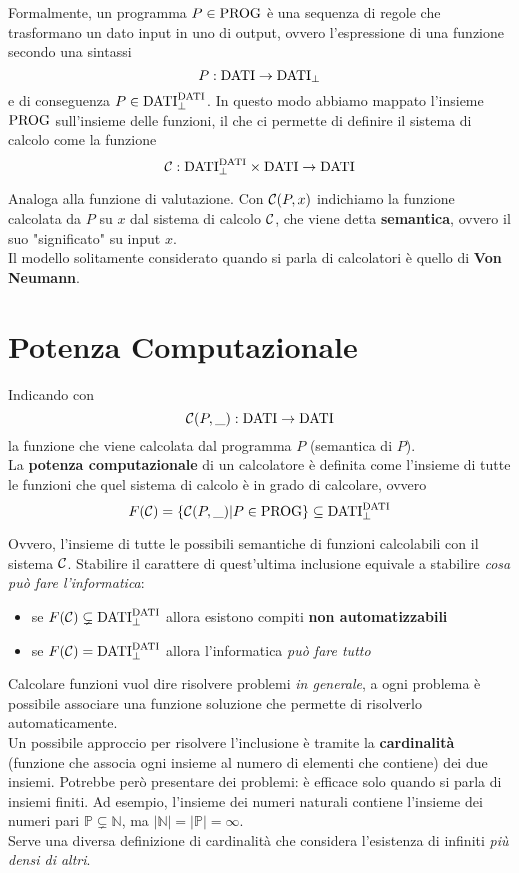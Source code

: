 Formalmente, un programma $P \in \text{PROG}$ è una sequenza di regole che trasformano un dato input in uno di output, ovvero l'espressione di una funzione secondo una sintassi 
$$ P: \text{DATI} \rightarrow \text{DATI}_\bot $$
e di conseguenza $P \in \text{DATI}^{\text{DATI}}_\bot$. In questo modo abbiamo mappato l'insieme $\text{PROG}$ sull'insieme delle funzioni, il che ci permette di definire il sistema di calcolo come la funzione
$$ \mathcal{C}: \text{DATI}^{\text{DATI}}_\bot \times \text{DATI} \rightarrow \text{DATI} $$

Analoga alla funzione di valutazione. Con $\mathcal{C}(P,x)$ indichiamo la funzione calcolata da $P$ su $x$ dal sistema di calcolo $\mathcal{C}$, che viene detta \textbf{semantica}, ovvero il suo "significato" su input $x$.\\

Il modello solitamente considerato quando si parla di calcolatori è quello di \textbf{Von Neumann}.\\

\section{Potenza Computazionale}
Indicando con 
$$ \mathcal{C} (P, \_): \text{DATI} \rightarrow \text{DATI} $$
la funzione che viene calcolata dal programma $P$ (semantica di $P$).\\

La \textbf{potenza computazionale} di un calcolatore è definita come l'insieme di tutte le funzioni che quel sistema di calcolo è in grado di calcolare, ovvero
$$ F(\mathcal{C}) = \{\mathcal{C} (P, \_) | P \in \text{PROG}\} \subseteq \text{DATI}_\bot^{\text{DATI}} $$

Ovvero, l'insieme di tutte le possibili semantiche di funzioni calcolabili con il sistema $\mathcal{C}$. Stabilire il carattere di quest'ultima inclusione equivale a stabilire \textit{cosa può fare l'informatica}:
\begin{itemize}
	\item se $F(\mathcal{C}) \subsetneq \text{DATI}_\bot^{\text{DATI}}$ allora esistono compiti \textbf{non automatizzabili}
	\item se $F(\mathcal{C}) = \text{DATI}_\bot^{\text{DATI}}$ allora l'informatica \textit{può fare tutto}
\end{itemize}

Calcolare funzioni vuol dire risolvere problemi \textit{in generale}, a ogni problema è possibile associare una funzione soluzione che permette di risolverlo automaticamente.\\

Un possibile approccio per risolvere l'inclusione è tramite la \textbf{cardinalità} (funzione che associa ogni insieme al numero di elementi che contiene) dei due insiemi. Potrebbe però presentare dei problemi: è efficace solo quando si parla di insiemi finiti. Ad esempio, l'insieme dei numeri naturali contiene l'insieme dei numeri pari $\mathbb{P} \subsetneq \mathbb{N}$, ma $|\mathbb{N}| = |\mathbb{P}| = \infty$.\\
Serve una diversa definizione di cardinalità che considera l'esistenza di infiniti \textit{più densi di altri}.\\

